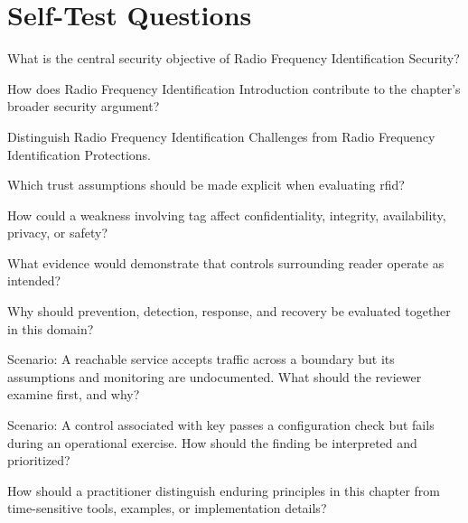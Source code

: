 \documentclass[11pt,letterpaper]{article}
\begin{document}
\section*{Self-Test Questions}
\begin{CornellRecallList}
\item What is the central security objective of Radio Frequency Identification Security?
\item How does Radio Frequency Identification Introduction contribute to the chapter's broader security argument?
\item Distinguish Radio Frequency Identification Challenges from Radio Frequency Identification Protections.
\item Which trust assumptions should be made explicit when evaluating rfid?
\item How could a weakness involving tag affect confidentiality, integrity, availability, privacy, or safety?
\item What evidence would demonstrate that controls surrounding reader operate as intended?
\item Why should prevention, detection, response, and recovery be evaluated together in this domain?
\item Scenario: A reachable service accepts traffic across a boundary but its assumptions and monitoring are undocumented. What should the reviewer examine first, and why?
\item Scenario: A control associated with key passes a configuration check but fails during an operational exercise. How should the finding be interpreted and prioritized?
\item How should a practitioner distinguish enduring principles in this chapter from time-sensitive tools, examples, or implementation details?
\end{CornellRecallList}
\end{document}

